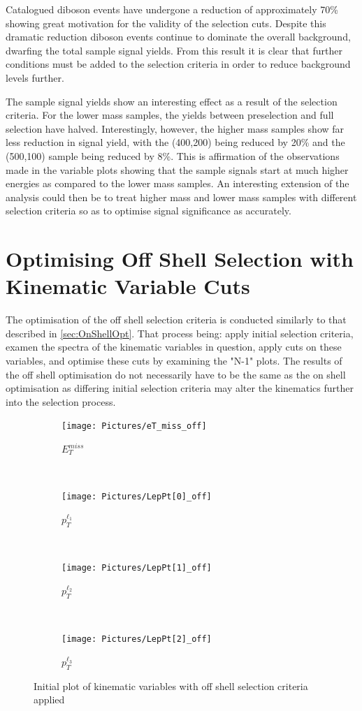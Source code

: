 Catalogued diboson events have undergone a reduction of approximately 70\% showing great motivation for the validity of the selection cuts.
Despite this dramatic reduction diboson events continue to dominate the overall background, dwarfing the total sample signal yields.
From this result it is clear that further conditions must be added to the selection criteria in order to reduce background levels further. 

The sample signal yields show an interesting effect as a result of the selection criteria.
For the lower mass samples, the yields between preselection and full selection have halved. 
Interestingly, however, the higher mass samples show far less reduction in signal yield, with the (400,200) being reduced by 20\% and the (500,100) sample being reduced by 8\%.
This is affirmation of the observations made in the variable plots showing that the sample signals start at much higher energies as compared to the lower mass samples.
An interesting extension of the analysis could then be to treat higher mass and lower mass samples with different selection criteria so as to optimise signal significance as accurately.

\section{Optimising Off Shell Selection with Kinematic Variable Cuts}
The optimisation of the off shell selection criteria is conducted similarly to that described in \ref{sec:OnShellOpt}.
That process being: apply initial selection criteria, examen the spectra of the kinematic variables in question, apply cuts on these variables, and optimise these cuts by examining the "N-1" plots. 
The results of the off shell optimisation do not necessarily have to be the same as the on shell optimisation as differing initial selection criteria may alter the kinematics further into the selection process.

\begin{figure}[H]
    \centering
    \begin{subfigure}[b]{0.48\textwidth}
        \centering
        \texttt{[image: Pictures/eT\_miss\_off]}
    \caption{$E_{T}^{miss}$}
    \end{subfigure}
    ~
    \begin{subfigure}[b]{0.48\textwidth}
        \centering
        \texttt{[image: Pictures/LepPt[0]\_off]}
    \caption{$p_{T}^{\ell_{1}}$}    
        \end{subfigure}
    ~
    \centering
    \begin{subfigure}[b]{0.48\textwidth}
        \centering
        \texttt{[image: Pictures/LepPt[1]\_off]}
    \caption{$p_{T}^{\ell_{2}}$}
    \end{subfigure}
    ~
    \begin{subfigure}[b]{0.48\textwidth}
        \centering
        \texttt{[image: Pictures/LepPt[2]\_off]}
    \caption{$p_{T}^{\ell_{3}}$}    
        \end{subfigure}
\caption{Initial plot of kinematic variables with off shell selection criteria applied}
\label{fig:initialKinematicsOff}
\end{figure}

